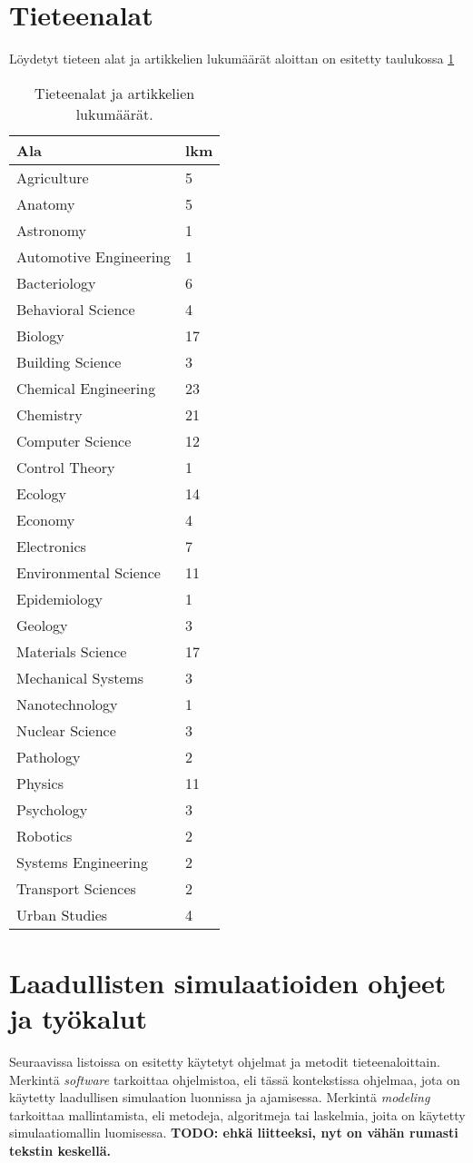 \documentclass[utf8]{gradu3}
\begin{document}
\section{Tieteenalat} \label{tieteenalat}
Löydetyt tieteen alat ja artikkelien lukumäärät aloittan on esitetty taulukossa \ref{table:alat}

\begin{table}[ht]
\centering
\begin{tabular}{ll}
\toprule
\textbf{Ala} & \textbf{lkm} \\
\midrule
Agriculture & 5 \\
Anatomy & 5 \\
Astronomy & 1 \\
Automotive Engineering & 1 \\
Bacteriology & 6 \\
Behavioral Science & 4 \\
Biology & 17 \\
Building Science & 3 \\
Chemical Engineering & 23 \\
Chemistry & 21 \\
Computer Science & 12 \\
Control Theory & 1 \\
Ecology & 14 \\
Economy & 4 \\
Electronics & 7 \\
Environmental Science & 11 \\
Epidemiology & 1 \\
Geology & 3 \\
Materials Science & 17 \\
Mechanical Systems & 3 \\
Nanotechnology & 1 \\
Nuclear Science & 3 \\
Pathology & 2 \\
Physics & 11 \\
Psychology & 3 \\
Robotics & 2 \\
Systems Engineering & 2 \\
Transport Sciences & 2 \\
Urban Studies & 4 \\
\bottomrule
\end{tabular}
\caption{Tieteenalat ja artikkelien lukumäärät.}
\label{table:alat}
\end{table}

\section{Laadullisten simulaatioiden ohjeet ja työkalut} \label{tyokalut}
Seuraavissa listoissa on esitetty käytetyt ohjelmat ja metodit tieteenaloittain. Merkintä \textit{software} tarkoittaa ohjelmistoa, eli tässä kontekstissa ohjelmaa, jota on käytetty laadullisen simulaation luonnissa ja ajamisessa. Merkintä \textit{modeling} tarkoittaa mallintamista, eli metodeja, algoritmeja tai laskelmia, joita on käytetty simulaatiomallin luomisessa. \textbf{TODO: ehkä liitteeksi, nyt on vähän rumasti tekstin keskellä.}
\end{document}
